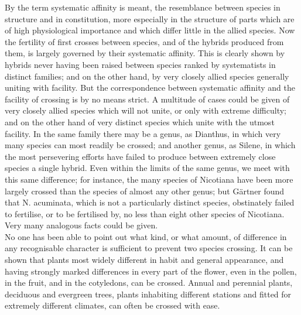 \indent By the term systematic affinity is meant, the resemblance between species in structure and in constitution, more especially in the structure of parts which are of high physiological importance and which differ little in the allied species. Now the fertility of first crosses between species, and of the hybrids produced from them, is largely governed by their systematic affinity. This is clearly shown by hybrids never having been raised between species ranked by systematists in distinct families; and on the other hand, by very closely allied species generally uniting with facility. But the correspondence between systematic affinity and the facility of crossing is by no means strict. A multitude of cases could be given of very closely allied species which will not unite, or only with extreme difficulty; and on the other hand of very distinct species which unite with the utmost facility. In the same family there may be a genus, as Dianthus, in which very many species can most readily be crossed; and another genus, as Silene, in which the most persevering efforts have failed to produce between extremely close species a single hybrid. Even within the limits of the same genus, we meet with this same difference; for instance, the many species of Nicotiana have been more largely crossed than the species of almost any other genus; but G\"{a}rtner found that N. acuminata, which is not a particularly distinct species, obstinately failed to fertilise, or to be fertilised by, no less than eight other species of Nicotiana. Very many analogous facts could be given.\\
\indent No one has been able to point out what kind, or what amount, of difference in any recognisable character is sufficient to prevent two species crossing. It can be shown that plants most widely different in habit and general appearance, and having strongly marked differences in every part of the flower, even in the pollen, in the fruit, and in the cotyledons, can be crossed. Annual and perennial plants, deciduous and evergreen trees, plants inhabiting different stations and fitted for extremely different climates, can often be crossed with ease.\\

